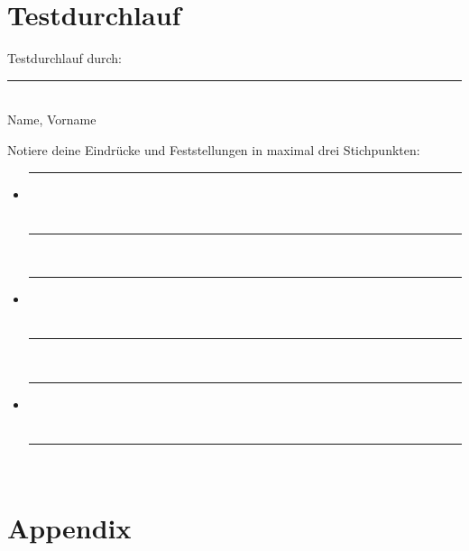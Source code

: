 \documentclass[10pt, fleqn]{scrartcl}
\begin{document}

\newpage

\section{Testdurchlauf}

Testdurchlauf durch:
\noindent\null
\rule{11.5cm}{.4pt} \\

\noindent\hspace*{7cm}
Name, Vorname \\
\vspace{1cm}

\noindent\null
Notiere deine Eindrücke und Feststellungen in maximal drei Stichpunkten:

\begin{itemize}
	\item \noindent\null\rule{14cm}{.4pt} \\
		  \vspace{0.1cm} \\
		  \noindent\null\rule{14cm}{.4pt} \\
	\item \noindent\null\rule{14cm}{.4pt} \\
		  \vspace{0.1cm} \\
		  \noindent\null\rule{14cm}{.4pt} \\
	\item \noindent\null\rule{14cm}{.4pt} \\
		  \vspace{0.1cm} \\
		  \noindent\null\rule{14cm}{.4pt} \\
\end{itemize}


\newpage

\printbibliography


\newpage

\appendix

\section{Appendix}
\end{document}
